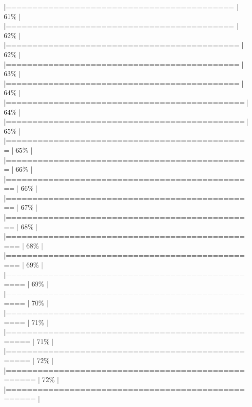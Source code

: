 \documentclass[
]{article}
\newenvironment{Shaded}{}{}
\begin{document}
\begin{Shaded}
\begin{Highlighting}[]
                                         |===========================================                           |  61\%  |                                                                              |===========================================                           |  62\%  |                                                                              |============================================                          |  62\%  |                                                                              |============================================                          |  63\%  |                                                                              |============================================                          |  64\%  |                                                                              |=============================================                         |  64\%  |                                                                              |=============================================                         |  65\%  |                                                                              |==============================================                        |  65\%  |                                                                              |==============================================                        |  66\%  |                                                                              |===============================================                       |  66\%  |                                                                              |===============================================                       |  67\%  |                                                                              |===============================================                       |  68\%  |                                                                              |================================================                      |  68\%  |                                                                              |================================================                      |  69\%  |                                                                              |=================================================                     |  69\%  |                                                                              |=================================================                     |  70\%  |                                                                              |=================================================                     |  71\%  |                                                                              |==================================================                    |  71\%  |                                                                              |==================================================                    |  72\%  |                                                                              |===================================================                   |  72\%  |                                                                              |===================================================                   |  
\end{Highlighting}
\end{Shaded}
\end{document}

